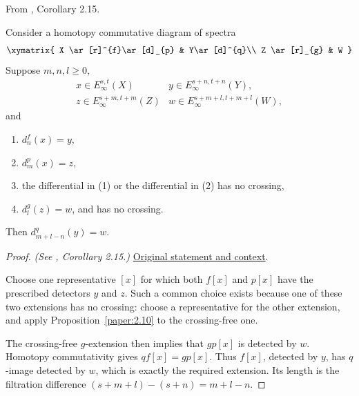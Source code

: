 \begin{corollary}
\label{paper:2.15}
From \cite{LWX126}, Corollary 2.15.\par
\label{cor:0012nik}
    Consider a homotopy commutative diagram of spectra
    $$\xymatrix{
    X \ar[r]^{f}\ar[d]_{p} & Y\ar[d]^{q}\\
    Z \ar[r]_{g} & W
    }$$
    Suppose $m,n,l\ge 0$, 
    $$\begin{array}{ll}
        x\in E^{s,t}_\infty(X) & y\in E^{s+n,t+n}_\infty(Y),\\
        z\in E^{s+m,t+m}_\infty(Z) & w\in E^{s+m+l,t+m+l}_\infty(W),
    \end{array}$$
    and
    \begin{enumerate}
        \item $d^{f}_{n}(x)=y$,
        \item $d^{p}_{m}(x)=z$,
        \item the differential in (1) or the differential in (2) has no crossing,
        \item $d^{g}_{l}(z)=w$, and has no crossing.
    \end{enumerate}
    Then $d^{q}_{m+l-n}(y)=w$.



\end{corollary}
\begin{proof}
\textit{(See \cite{LWX126}, Corollary 2.15.)} \href{paper/main.tex.html#L555}{Original statement and context}.

Choose one representative $[x]$ for which both $f[x]$ and $p[x]$ have the prescribed detectors $y$ and $z$. Such a common choice exists because one of these two extensions has no crossing: choose a representative for the other extension, and apply Proposition~\ref{paper:2.10} to the crossing-free one.

The crossing-free $g$-extension then implies that $gp[x]$ is detected by $w$. Homotopy commutativity gives $qf[x]=gp[x]$. Thus $f[x]$, detected by $y$, has $q$-image detected by $w$, which is exactly the required extension. Its length is the filtration difference $(s+m+l)-(s+n)=m+l-n$.
\end{proof}

